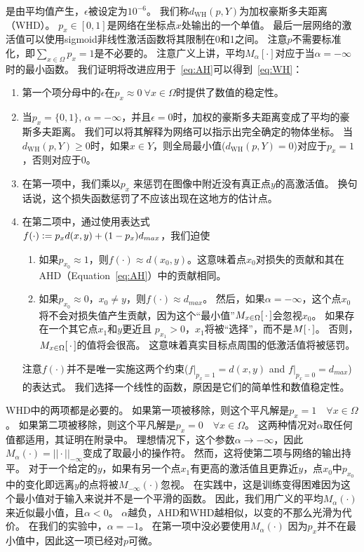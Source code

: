 \documentclass[10pt,twocolumn,letterpaper,UTF8]{article}
\begin{document}
是由平均值产生，$\epsilon$被设定为$10^{-6}$。
我们称$d_{\text{WH}}(p, Y)$为加权豪斯多夫距离（WHD）。
$p_x \in [0, 1]$是网络在坐标点$x$处输出的一个单值。
最后一层网络的激活值可以使用sigmoid非线性激活函数将其限制在0和1之间。
注意$p$不需要标准化，即$\sum_{x\in \Omega} p_x = 1$是不必要的。
注意广义上讲，平均$M_\alpha \left[ \cdot \right]$对应于当$\alpha=-\infty$时的最小函数。
我们证明将改进应用于~\eqref{eq:AH}可以得到~\eqref{eq:WH}：
\begin{enumerate}
  \item 第一个项分母中的$\epsilon$在$p_x \approx 0 ~ \forall x \in \Omega$时提供了数值的稳定性。
  \item 当$p_x = \{0, 1\}$, $\alpha=-\infty$，并且$\epsilon = 0$时，加权的豪斯多夫距离变成了平均的豪斯多夫距离。
        我们可以将其解释为网络可以指示出完全确定的物体坐标。
        当$d_{\text{WH}}(p, Y) \geq 0$时，如果$x\in Y$，则全局最小值($d_{\text{WH}}(p, Y) = 0$)对应于$p_x = 1$，否则对应于0。
  \item 在第一项中，我们乘以$p_x$ 来惩罚在图像中附近没有真正点$y$的高激活值。
        换句话说，这个损失函数惩罚了不应该出现在这地方的估计点。
  \item 
        在第二项中，通过使用表达式\\ $f(\cdot) \vcentcolon = p_x d(x, y) + (1 - p_x) d_{max}$，我们迫使
      \begin{enumerate}
          \item
                如果$p_{x_0} \approx 1$，则$f(\cdot) \approx d(x_0, y)$。这意味着点$x_0$对损失的贡献和其在AHD（Equation~\eqref{eq:AH}）中的贡献相同。
          \item 如果$p_{x_0} \approx 0$，$x_0 \neq y$，则$f(\cdot) \approx d_{max}$。
                然后，如果$\alpha = -\infty$，这个点$x_0$将不会对损失值产生贡献，因为这个“最小值”$M_{x\in \Omega}[\thinspace\cdot\thinspace]$会忽视$x_0$。
                如果存在一个其它点$x_1$和$y$更近且 $p_{x_1} > 0$，$x_1$将被“选择”，而不是$M[\thinspace\cdot\thinspace]$。
                否则，$M_{x\in \Omega}[\thinspace\cdot\thinspace]$的值将会很高。
                这意味着真实目标点周围的低激活值将被惩罚。
      \end{enumerate}
      注意$f(\cdot)$并不是唯一实施这两个约束($f|_{p_x = 1} = d(x, y)$ and $f|_{p_x = 0} = d_{max}$)的表达式。
      我们选择一个线性的函数，原因是它们的简单性和数值稳定性。
\end{enumerate}

WHD中的两项都是必要的。
如果第一项被移除，则这个平凡解是$p_x = 1 \quad \forall x \in \Omega$。
如果第二项被移除，则这个平凡解是$p_x = 0 \quad \forall x \in \Omega$。
这两种情况对$\alpha$取任何值都适用，其证明在附录中。
理想情况下，这个参数$\alpha \to -\infty$，因此$M_\alpha(\cdot) = ||\cdot||_{-\infty}$变成了取最小的操作符\cite{minimum}。
然而，这将使第二项与网络的输出持平。
对于一个给定的$y$，如果有另一个点$x_1$有更高的激活值且更靠近$y$，点$x_0$中$p_{x_0}$中的变化即远离$y$的点将被$M_{-\infty}(\cdot)$忽视。
在实践中，这是训练变得困难因为这个最小值对于输入来说并不是一个平滑的函数。
因此，我们用广义的平均$M_\alpha(\cdot)$来近似最小值，且$\alpha<0$。
$\alpha$越负，AHD和WHD越相似，以变的不那么光滑为代价。
在我们的实验中，$\alpha=-1$。
在第一项中没必要使用$M_\alpha(\cdot)$
因为$p_x$并不在最小值中，因此这一项已经对$p$可微。
\end{document}
